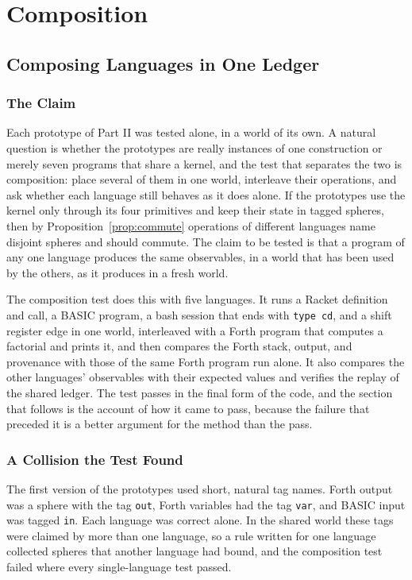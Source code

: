 \part{Composition}

\chapter{Composing Languages in One Ledger}

\section{The Claim}

Each prototype of Part II was tested alone, in a world of its own. A natural question is whether the prototypes are really instances of one construction or merely seven programs that share a kernel, and the test that separates the two is composition: place several of them in one world, interleave their operations, and ask whether each language still behaves as it does alone. If the prototypes use the kernel only through its four primitives and keep their state in tagged spheres, then by Proposition~\ref{prop:commute} operations of different languages name disjoint spheres and should commute. The claim to be tested is that a program of any one language produces the same observables, in a world that has been used by the others, as it produces in a fresh world.

The composition test does this with five languages. It runs a Racket definition and call, a BASIC program, a bash session that ends with \texttt{type cd}, and a shift register edge in one world, interleaved with a Forth program that computes a factorial and prints it, and then compares the Forth stack, output, and provenance with those of the same Forth program run alone. It also compares the other languages' observables with their expected values and verifies the replay of the shared ledger. The test passes in the final form of the code, and the section that follows is the account of how it came to pass, because the failure that preceded it is a better argument for the method than the pass.

\section{A Collision the Test Found}

The first version of the prototypes used short, natural tag names. Forth output was a sphere with the tag \texttt{out}, Forth variables had the tag \texttt{var}, and BASIC input was tagged \texttt{in}. Each language was correct alone. In the shared world these tags were claimed by more than one language, so a rule written for one language collected spheres that another language had bound, and the composition test failed where every single-language test passed.

